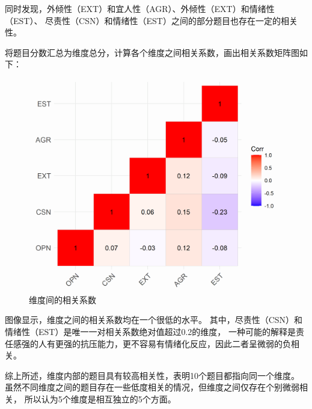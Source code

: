 \documentclass[UTF8]{ctexart}
\begin{document}
同时发现，外倾性（EXT）和宜人性（AGR）、外倾性（EXT）和情绪性（EST）、
尽责性（CSN）和情绪性（EST）之间的部分题目也存在一定的相关性。\par
将题目分数汇总为维度总分，计算各个维度之间相关系数，画出相关系数矩阵图如下：
\begin{figure}[H]
  \centering
  \includegraphics[scale=0.7]{Corrplot_Dimension.png}
  \caption{维度间的相关系数}
\end{figure}
图像显示，维度之间的相关系数均在一个很低的水平。
其中，尽责性（CSN）和情绪性（EST）是唯一一对相关系数绝对值超过0.2的维度，
一种可能的解释是责任感强的人有更强的抗压能力，更不容易有情绪化反应，因此二者呈微弱的负相关。\par
综上所述，维度内部的题目具有较高相关性，表明10个题目都指向同一个维度。
虽然不同维度之间的题目存在一些低度相关的情况，但维度之间仅存在个别微弱相关，
所以认为5个维度是相互独立的5个方面。
\end{document}
